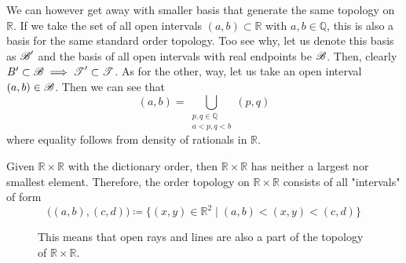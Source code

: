   \begin{example}
    We can however get away with smaller basis that generate the same topology on $\mathbb{R}$. If we take the set of all open intervals $(a, b) \subset \mathbb{R}$ with $a, b \in \mathbb{Q}$, this is also a basis for the same standard order topology. Too see why, let us denote this basis as $\B^\prime$ and the basis of all open intervals with real endpoints be $\B$. Then, clearly $B^\prime \subset \B \implies \T^\prime \subset \T$. As for the other, way, let us take an open interval $(a, b) \in \B$. Then we can see that 
    \begin{equation}
      (a, b) = \bigcup_{\substack{p, q \in \mathbb{Q} \\ a < p, q < b}} (p, q)
    \end{equation}
    where equality follows from density of rationals in $\mathbb{R}$. 
  \end{example}

  \begin{example}
    Given $\mathbb{R} \times \mathbb{R}$ with the dictionary order, then $\mathbb{R} \times \mathbb{R}$ has neither a largest nor smallest element. Therefore, the order topology on $\mathbb{R} \times \mathbb{R}$ consists of all "intervals" of form
    \begin{equation}
      \big((a, b), (c, d) \big) \coloneqq  \{(x, y) \in \mathbb{R}^2 \mid (a, b) < (x, y) < (c, d)\}
    \end{equation}

    \begin{figure}[H]
      \centering 
      \caption{This means that open rays and lines are also a part of the topology of $\mathbb{R} \times \mathbb{R}$. } 
      \label{fig:r2_dict_order}
    \end{figure}
  \end{example}

